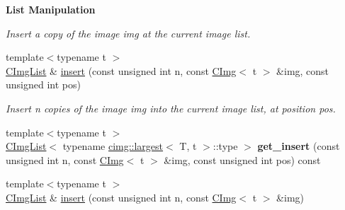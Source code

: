 \begin{Indent}{\bf List Manipulation}
\begin{DoxyCompactItemize}
\begin{DoxyCompactList}\small\item\em Insert a copy of the image {\ttfamily img} at the current image list. \item\end{DoxyCompactList}\item 
\hypertarget{structcimg__library_1_1_c_img_list_a16c607ca628506d5e360e699cb08fc8e}{
{\footnotesize template$<$typename t $>$ }\\\hyperlink{structcimg__library_1_1_c_img_list}{CImgList} \& \hyperlink{structcimg__library_1_1_c_img_list_a16c607ca628506d5e360e699cb08fc8e}{insert} (const unsigned int n, const \hyperlink{structcimg__library_1_1_c_img}{CImg}$<$ t $>$ \&img, const unsigned int pos)}
\label{structcimg__library_1_1_c_img_list_a16c607ca628506d5e360e699cb08fc8e}

\begin{DoxyCompactList}\small\item\em Insert n copies of the image {\ttfamily img} into the current image list, at position {\ttfamily pos}. \item\end{DoxyCompactList}\item 
\hypertarget{structcimg__library_1_1_c_img_list_ad511b85d4f4cac76af79018975a5ba70}{
{\footnotesize template$<$typename t $>$ }\\\hyperlink{structcimg__library_1_1_c_img_list}{CImgList}$<$ typename \hyperlink{structcimg__library_1_1cimg_1_1largest}{cimg::largest}$<$ T, t $>$::type $>$ {\bfseries get\_\-insert} (const unsigned int n, const \hyperlink{structcimg__library_1_1_c_img}{CImg}$<$ t $>$ \&img, const unsigned int pos) const }
\label{structcimg__library_1_1_c_img_list_ad511b85d4f4cac76af79018975a5ba70}

\item 
\hypertarget{structcimg__library_1_1_c_img_list_ae0dc70456b799f95c264c3558780046d}{
{\footnotesize template$<$typename t $>$ }\\\hyperlink{structcimg__library_1_1_c_img_list}{CImgList} \& \hyperlink{structcimg__library_1_1_c_img_list_ae0dc70456b799f95c264c3558780046d}{insert} (const unsigned int n, const \hyperlink{structcimg__library_1_1_c_img}{CImg}$<$ t $>$ \&img)}
\label{structcimg__library_1_1_c_img_list_ae0dc70456b799f95c264c3558780046d}


\end{DoxyCompactItemize}
\end{Indent}
